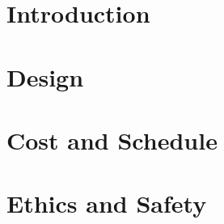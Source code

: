 \documentclass[12pt]{article}
\begin{document}

\clearpage
\section{Introduction}

\clearpage
\section{Design}

\clearpage
\section{Cost and Schedule}

\clearpage
\section{Ethics and Safety}


\clearpage
\printbibliography[heading=bibintoc, title={References}]

%     
\end{document}
